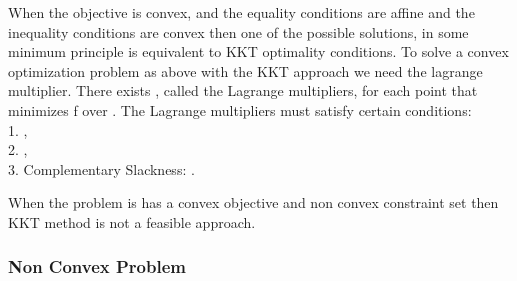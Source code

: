 \par
When the objective is convex, and the equality conditions are affine and the inequality conditions are convex then one of the possible solutions, in some minimum principle is equivalent to \ac{KKT} optimality conditions. To solve a convex optimization problem as above with the \ac{KKT} approach we need the lagrange multiplier. There exists , called the Lagrange multipliers, for each point  that minimizes f over . The Lagrange multipliers must satisfy certain conditions:\\
1. ,\\
2. ,\\
3. Complementary Slackness: .\\
\par 
When the problem is has a convex objective and non convex constraint set then \ac{KKT} method is not a feasible approach. 


\subsubsection{Non Convex Problem}

